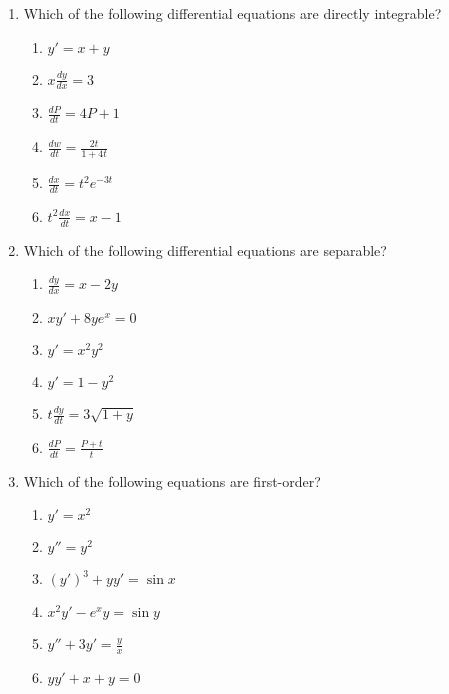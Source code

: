 \documentclass{nosvagor-notes}
\begin{document}
\begin{enumerate}
  \item Which of the following differential equations are directly integrable?
  \begin{multicols}{2}
    \begin{enumerate}
      \item \(y'=x+y\)
      \item \(x \frac{dy}{dx} = 3\)
      \item \(\frac{dP}{dt} = 4P + 1\)
      \item \(\frac{dw}{dt} = \frac{2t}{1+4t}\)
      \item \(\frac{dx}{dt} = t^2 e^{-3t}\)
      \item \(t^2 \frac{dx}{dt} = x - 1\)
    \end{enumerate}
  \end{multicols}

  \newpage

  \item Which of the following differential equations are separable?
  \begin{multicols}{2}
    \begin{enumerate}
      \item \(\frac{dy}{dx} = x - 2y\)
      \item \(xy' + 8ye^x = 0\)
      \item \(y' = x^2y^2\)
      \item \(y' = 1-y^2\)
      \item \(t \frac{dy}{dt} = 3 \sqrt{1+y} \)
      \item \(\frac{dP}{dt} = \frac{P+t}{t}\)
    \end{enumerate}
  \end{multicols}
  \vspace{256pt}

  \item Which of the following equations are first-order?
    \begin{multicols}{2}
      \begin{enumerate}
        \item \(y' = x^2 \)
        \item \(y'' = y^2\)
        \item \((y')^3 + yy' = \sin x\)
        \item \(x^2y' - e^xy = \sin y\)
        \item \(y'' + 3y' = \frac{y}{x}\)
        \item \(yy' + x + y = 0\)
      \end{enumerate}
    \end{multicols}

\end{enumerate}
\end{document}
